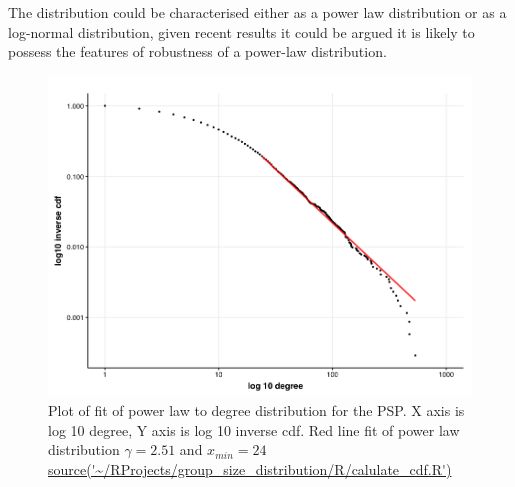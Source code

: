 The distribution could be characterised either as a power law distribution or as a log-normal distribution, given recent results it could be argued it is likely to possess the features of robustness of a power-law distribution\cite{serafino2021true}.






\begin{figure}
    \centering
    \includegraphics[width=\linewidth]{images/chapter3/ggplot2/theme/powerlaw/Rplot01_chapter3_cdf_and_powerlaw.png}
    \caption[Plot of power law fit to degree distribution of PSP]{Plot of fit of power law to degree distribution for the PSP. X axis is log 10 degree, Y axis is log 10 inverse cdf. Red line fit of power law distribution $\gamma= 2.51$ and $x_{min}=24$ \url{source('~/RProjects/group_size_distribution/R/calulate_cdf.R')}}
    \label{fig:poweRlaw plot ggplot2}
\end{figure}



